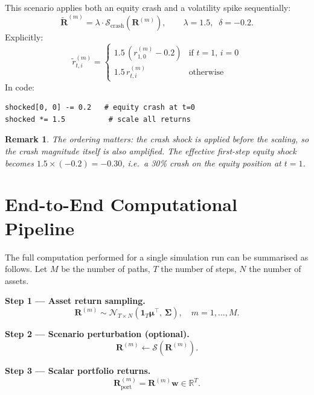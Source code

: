 \documentclass[12pt, a4paper]{article}
\newtheorem{remark}{Remark}[section]
\begin{document}
This scenario applies both an equity crash and a volatility spike
sequentially:
\begin{equation}
    \widetilde{\mathbf{R}}^{(m)} = \lambda \cdot \mathcal{S}_{\text{crash}}(\mathbf{R}^{(m)}),
    \qquad \lambda = 1.5,\;\; \delta = -0.2.
\end{equation}
Explicitly:
\begin{equation}
    \boxed{\widetilde{r}^{(m)}_{t,i} =
    \begin{cases}
        1.5\,(r^{(m)}_{1,0} - 0.2) & \text{if } t = 1,\, i = 0 \\
        1.5\, r^{(m)}_{t,i}         & \text{otherwise}
    \end{cases}}
    \label{eq:combined_stress}
\end{equation}
In code:
\begin{lstlisting}
shocked[0, 0] -= 0.2   # equity crash at t=0
shocked *= 1.5          # scale all returns
\end{lstlisting}

\begin{remark}
    The ordering matters: the crash shock is applied \emph{before} the scaling,
    so the crash magnitude itself is also amplified. The effective first-step
    equity shock becomes $1.5 \times (-0.2) = -0.30$, i.e.\ a 30\% crash on
    the equity position at $t=1$.
\end{remark}

\section{End-to-End Computational Pipeline}

The full computation performed for a single simulation run can be summarised
as follows. Let $M$ be the number of paths, $T$ the number of steps, $N$ the
number of assets.

\bigskip
\noindent\textbf{Step 1 — Asset return sampling.}
\[
    \mathbf{R}^{(m)} \sim \mathcal{N}_{T \times N}(\bm{1}_T \bm{\mu}^\top,\,\bm{\Sigma}),
    \quad m = 1, \ldots, M.
\]

\noindent\textbf{Step 2 — Scenario perturbation (optional).}
\[
    \mathbf{R}^{(m)} \leftarrow \mathcal{S}(\mathbf{R}^{(m)}).
\]

\noindent\textbf{Step 3 — Scalar portfolio returns.}
\[
    \bm{R}^{(m)}_{\text{port}} = \mathbf{R}^{(m)} \bm{w} \in \mathbb{R}^T.
\]
\end{document}
